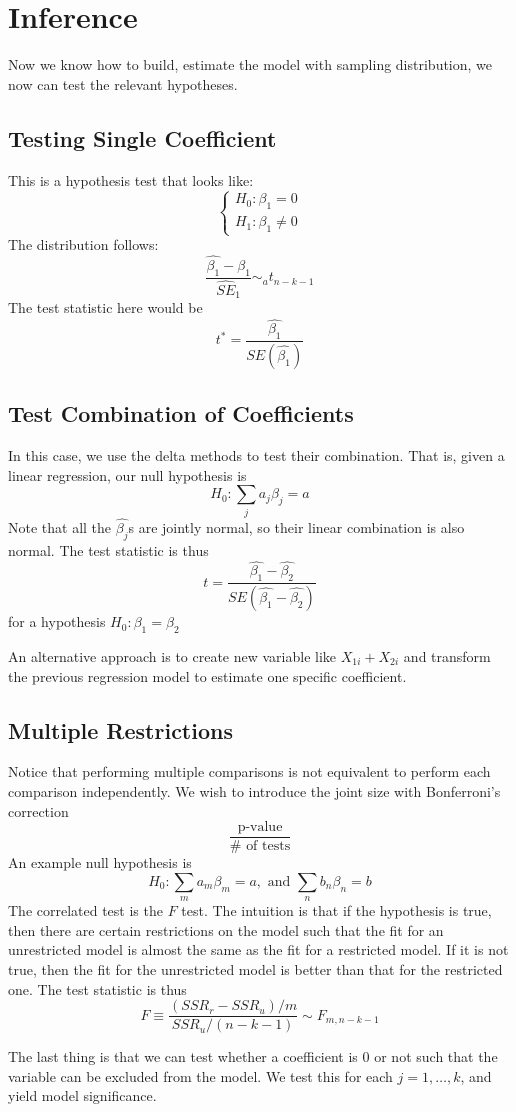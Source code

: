 \section{Inference}
Now we know how to build, estimate the model with sampling distribution, we now can test the relevant hypotheses.

\subsection{Testing Single Coefficient}
This is a hypothesis test that looks like:
$$\begin{cases}
    H_0: \beta_1 = 0 \\
    H_1: \beta_1 \ne 0
\end{cases}$$
The distribution follows:
$$\frac{\hat{\beta_1} - \beta_1}{\hat{SE}_1} \sim_a t_{n - k - 1}$$
The test statistic here would be
$$t^{*} = \frac{\hat{\beta_1}}{SE(\hat{\beta_1})}$$

\subsection{Test Combination of Coefficients}
In this case, we use the delta methods to test their combination. That is, given a linear regression, our null hypothesis is 
$$H_0: \sum_{j} a_j \beta_j = a$$
Note that all the $\hat{\beta_j}$s are jointly normal, so their linear combination is also normal. The test statistic is thus
$$t = \frac{\hat{\beta_1} - \hat{\beta_2}}{SE(\hat{\beta_1} - \hat{\beta_2})}$$
for a hypothesis $H_0: \beta_1 = \beta_2$

An alternative approach is to create new variable like $X_{1i} + X_{2i}$ and transform the previous regression model to estimate one specific coefficient.

\subsection{Multiple Restrictions}
Notice that performing multiple comparisons is not equivalent to perform each comparison independently. We wish to introduce the joint size with Bonferroni's correction
$$\frac{\text{p-value}}{\# \text{ of tests}}$$
An example null hypothesis is
$$H_0: \sum_{m} a_m \beta_m = a, \text{ and } \sum_{n} b_n \beta_n = b$$
The correlated test is the $F$ test. The intuition is that if the hypothesis is true, then there are certain restrictions on the model such that the fit for an unrestricted model is almost the same as the fit for a restricted model. If it is not true, then the fit for the unrestricted model is better than that for the restricted one. The test statistic is thus
$$F \equiv \frac{(SSR_r - SSR_u) / m}{SSR_u / (n - k - 1)} \sim F_{m, n - k - 1}$$

The last thing is that we can test whether a coefficient is $0$ or not such that the variable can be excluded from the model. We test this for each $j = 1, \dots, k$, and yield model significance.

\newpage